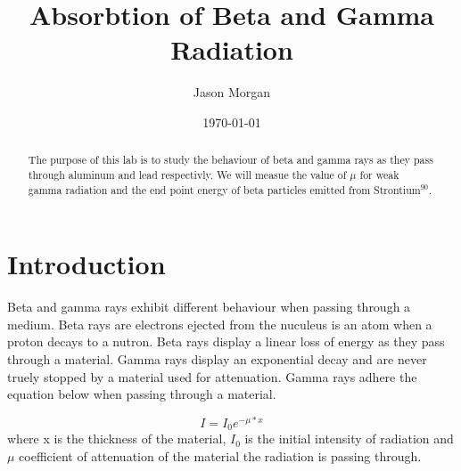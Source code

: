 \documentclass[twocolumn,secnumarabic,amssymb, nobibnotes, aps, pra]{revtex4}
\begin{document}
\title{Absorbtion of Beta and Gamma Radiation
 }


\author{Jason Morgan}
\date{\today}


\begin{abstract}

The purpose of this lab is to study the behaviour of beta and gamma rays as they pass through aluminum and lead respectivly. We will measue the value of $\mu$ for weak gamma radiation and the end point energy of beta particles emitted from Strontium$^{90}$.

\end{abstract}

\maketitle
\section{Introduction}

Beta and gamma rays exhibit different behaviour when passing through a medium.  Beta rays are electrons ejected from the nuculeus is an atom when a proton decays to a nutron.  Beta rays display a linear loss of energy as they pass through a material.  Gamma rays display an exponential decay and are never truely stopped by a material used for attenuation.  Gamma rays adhere the equation below when passing through a material.

\begin{equation}
I = I_0 e^{-\mu * x}
\label{Attenuation of gamma rays}   %
\end{equation}
where x is the thickness of the material, $I_0$  is the initial intensity of radiation and $\mu$ coefficient of attenuation of the material the radiation is passing through. 
\end{document}
